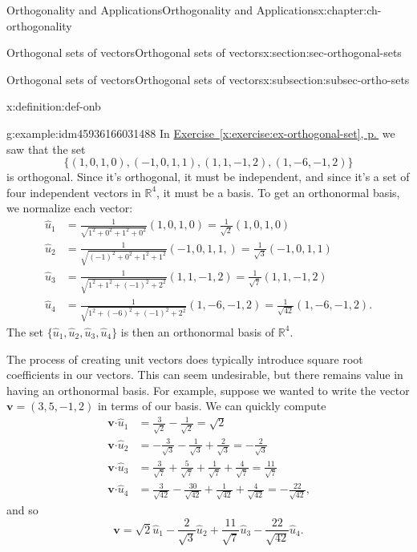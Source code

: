 \documentclass[oneside,10pt,]{book}
\newcommand{\xreffont}{\relax}
\numberwithin{equation}{section}
\newcommand{\R}{\mathbb{R}}
\newcommand{\dotp}{\!\boldsymbol{\cdot}\!}
\newcommand{\vv}{\mathbf{v}}
\newcommand{\amp}{&}
\begin{document}
\begin{chapterptx}{Orthogonality and Applications}{}{Orthogonality and Applications}{}{}{x:chapter:ch-orthogonality}
\begin{sectionptx}{Orthogonal sets of vectors}{}{Orthogonal sets of vectors}{}{}{x:section:sec-orthogonal-sets}
\begin{subsectionptx}{Orthogonal sets of vectors}{}{Orthogonal sets of vectors}{}{}{x:subsection:subsec-ortho-sets}
\begin{definition}{}{x:definition:def-onb}
\end{definition}
\begin{example}{}{g:example:idm45936166031488}%
In \hyperref[x:exercise:ex-orthogonal-set]{Exercise~{\xreffont\ref{x:exercise:ex-orthogonal-set}}, p.\,\pageref{x:exercise:ex-orthogonal-set}} we saw that the set%
\begin{equation*}
\{(1,0,1,0), (-1,0,1,1), (1,1,-1,2),(1,-6,-1,2)\}
\end{equation*}
is orthogonal. Since it's orthogonal, it must be independent, and since it's a set of four independent vectors in \(\R^4\), it must be a basis. To get an orthonormal basis, we normalize each vector:%
\begin{align*}
\hat{u}_1 \amp = \frac{1}{\sqrt{1^2+0^2+1^2+0^2}}(1,0,1,0) = \frac{1}{\sqrt{2}}(1,0,1,0)\\
\hat{u}_2 \amp = \frac{1}{\sqrt{(-1)^2+0^2+1^2+1^2}}(-1,0,1,1,) = \frac{1}{\sqrt{3}}(-1,0,1,1)\\
\hat{u}_3 \amp = \frac{1}{\sqrt{1^2+1^2+(-1)^2+2^2}}(1,1,-1,2) = \frac{1}{\sqrt{7}}(1,1,-1,2)\\
\hat{u}_4 \amp = \frac{1}{\sqrt{1^2+(-6)^2+(-1)^2+2^2}}(1,-6,-1,2) = \frac{1}{\sqrt{42}}(1,-6,-1,2)\text{.}
\end{align*}
The set \(\{\hat{u}_1,\hat{u}_2,\hat{u}_3,\hat{u}_4\}\) is then an orthonormal basis of \(\R^4\).%
\end{example}
The process of creating unit vectors does typically introduce square root coefficients in our vectors. This can seem undesirable, but there remains value in having an orthonormal basis. For example, suppose we wanted to write the vector \(\vv=(3,5,-1,2)\) in terms of our basis. We can quickly compute%
\begin{align*}
\vv\dotp\hat{u}_1 \amp = \frac{3}{\sqrt{2}}-\frac{1}{\sqrt{2}}=\sqrt{2}\\
\vv\dotp\hat{u}_2 \amp = -\frac{3}{\sqrt{3}}-\frac{1}{\sqrt{3}}+\frac{2}{\sqrt{3}}=-\frac{2}{\sqrt{3}}\\
\vv\dotp\hat{u}_3 \amp = \frac{3}{\sqrt{7}}+\frac{5}{\sqrt{7}}+\frac{1}{\sqrt{7}}+\frac{4}{\sqrt{7}} = \frac{11}{\sqrt{7}}\\
\vv\dotp\hat{u}_4 \amp = \frac{3}{\sqrt{42}}-\frac{30}{\sqrt{42}}+\frac{1}{\sqrt{42}}+\frac{4}{\sqrt{42}} = -\frac{22}{\sqrt{42}}\text{,}
\end{align*}
and so%
\begin{equation*}
\vv = \sqrt{2}\hat{u}_1-\frac{2}{\sqrt{3}}\hat{u}_2+\frac{11}{\sqrt{7}}\hat{u}_3-\frac{22}{\sqrt{42}}\hat{u}_4\text{.}

\end{equation*}
\end{subsectionptx}
\end{sectionptx}
\end{chapterptx}
\end{document}
